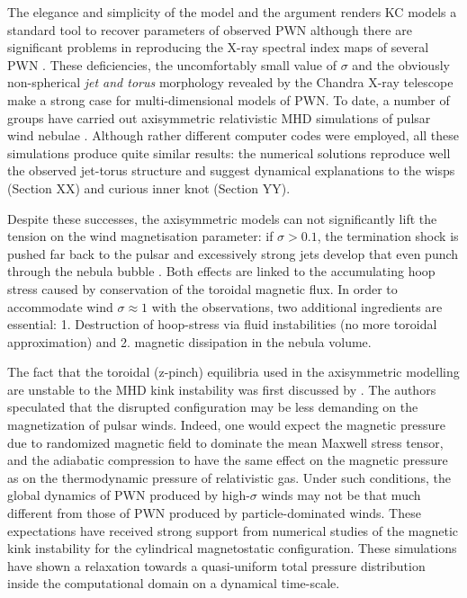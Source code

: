 The elegance and simplicity of the \cite{1984ApJ...283..694K} model and the \cite{1974MNRAS.167....1R} argument renders KC models a standard tool to recover parameters of observed PWN \citep[e.g.][]{sefakodeJager2003,PetreHwang2007} although there are significant problems in reproducing the X-ray spectral index maps of several PWN \citep{reynolds2003,tang2012,NynkaHailey2014,PorthVorster2016}.  
These deficiencies, the uncomfortably small value of $\sigma$ and the obviously non-spherical \emph{jet and torus} morphology revealed by the Chandra X-ray telescope \citep{KargaltsevPavlov2008} make a strong case for multi-dimensional models of PWN.  
To date, a number of groups have carried out axisymmetric relativistic MHD simulations of pulsar wind nebulae \citep{komissarov2003a,komissarov2004,del-zanna2004,bogovalov2005,camus2009,2014MNRAS.438.1518O}. Although rather different computer codes were employed, all these simulations produce quite similar results: the numerical solutions reproduce well the observed jet-torus structure and suggest dynamical explanations to the wisps (Section XX) and curious inner knot (Section YY).  


Despite these successes, the axisymmetric models can not significantly lift the tension on the wind magnetisation parameter:  if $\sigma>0.1$, the termination shock is pushed far back to the pulsar and excessively strong jets develop that even punch through the nebula bubble \citep[e.g.][]{PorthKomissarov2013}.  
Both effects are linked to the accumulating hoop stress caused by conservation of the toroidal magnetic flux.  
In order to accommodate wind $\sigma\approx1$ with the observations, two additional ingredients are essential:  1. Destruction of hoop-stress via fluid instabilities (no more toroidal approximation) and 2. magnetic dissipation in the nebula volume.  

The fact that the toroidal (z-pinch) equilibria used in the axisymmetric modelling \citep[e.g.][]{begelman1992} are unstable to the MHD kink instability was first discussed by \cite{begelman1998}.  
The authors speculated that the disrupted configuration may be less demanding on the magnetization of pulsar winds. Indeed, one would expect the magnetic pressure due to randomized magnetic field to dominate the mean Maxwell stress tensor, and the adiabatic compression to have the same effect on the magnetic pressure as on the thermodynamic pressure of relativistic gas. Under such conditions, the global dynamics of PWN produced by high-$\sigma$ winds may not be that much different from those of PWN produced by particle-dominated winds. These expectations have received strong support from numerical studies \citep{Mizuno:2011aa} of the magnetic kink instability for the cylindrical magnetostatic configuration.  These simulations have shown a relaxation towards a quasi-uniform total pressure distribution inside the computational domain on a dynamical time-scale. 

